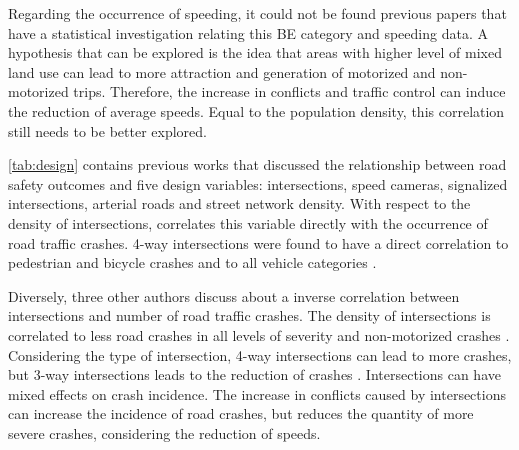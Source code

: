 Regarding the occurrence of speeding, it could not be found previous papers that have a statistical investigation relating this BE category and speeding data. A hypothesis that can be explored is the idea that areas with higher level of mixed land use can lead to more attraction and generation of motorized and non-motorized trips. Therefore, the increase in conflicts and traffic control can induce the reduction of average speeds. Equal to the population density, this correlation still needs to be better explored. 

\autoref{tab:design} contains previous works that discussed the relationship between road safety outcomes and five design variables: intersections, speed cameras, signalized intersections, arterial roads and street network density. With respect to the density of intersections, \textcite{Dumbaugh2011,Dumbaugh2013,Elvik2009,Huang2018} correlates this variable directly with the occurrence of road traffic crashes. 4-way intersections were found to have a direct correlation to pedestrian and bicycle crashes \cite{Dumbaugh2011, Dumbaugh2013} and to all vehicle categories \cite{Huang2018}.

Diversely, three other authors discuss about a inverse correlation between intersections and number of road traffic crashes. The density of intersections is correlated to less road crashes in all levels of severity \cite{Marshall2011, Ouyang2014} and non-motorized crashes \cite{Zhang2015}. Considering the type of intersection, 4-way intersections can lead to more crashes, but 3-way intersections leads to the reduction of crashes \cite{Ewing2009}. Intersections can have mixed effects on crash incidence. The increase in conflicts caused by intersections can increase the incidence of road crashes, but reduces the quantity of more severe crashes, considering the reduction of speeds.  

